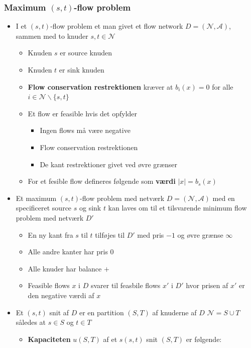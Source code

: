 \subsubsection{Maximum $(s,t)$-flow problem}
\begin{itemize}
	\item I et $(s,t)$-flow problem et man givet et flow network $D=(\mathcal N, \mathcal A)$, sammen med to knuder $s,t \in \mathcal N$
  \begin{itemize}
  	\item Knuden $s$ er source knuden
  	\item Knuden $t$ er sink knuden
    \item \textbf{Flow conservation restrektionen} kræver at $b_i(x) = 0$ for alle $i \in \mathcal N \backslash \{s,t\}$
    \item Et flow er feasible hvis det opfylder
    \begin{itemize}
    	\item Ingen flows må være negative
      \item Flow conservation restrektionen
      \item De kant restrektioner givet ved øvre grænser
    \end{itemize}
    \item For et fesible flow defineres følgende som \textbf{værdi} $|x| = b_s(x)$
  \end{itemize}
  \item Et maximum $(s,t)$-flow problem med netværk $D=(\mathcal N, \mathcal A)$ med en specificeret source $s$ og sink $t$ kan laves om til et tilsvarende minimum flow problem med netværk $D'$ 
  \begin{itemize}
  	\item En ny kant fra $s$ til $t$ tilføjes til $D'$ med pris $-1$ og øvre grænse $\infty$
    \item Alle andre kanter har pris $0$
    \item Alle knuder har balance $+$
    \item Feasible flows $x$ i $D$ svarer til feasbile flows $x'$ i $D'$ hvor prisen af $x'$ er den negative værdi af $x$ 
  \end{itemize}
  \item Et $(s,t)$ snit af $D$ er en partition $(S,T)$ af knuderne af $D$ $\mathcal N = S \cup T$ således at $s \in S$ og $t \in T$ 
  \begin{itemize}
    \item \textbf{Kapaciteten} $u(S,T)$ af et $s(s,t)$ snit $(S,T)$ er følgende:

\end{itemize}
\end{itemize}
